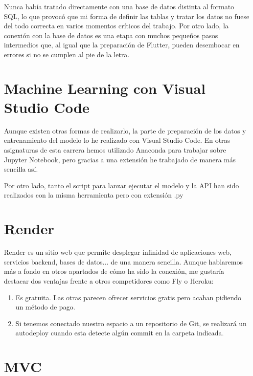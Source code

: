 	Nunca había tratado directamente con una base de datos distinta al formato SQL, lo que provocó que mi forma de definir las tablas y tratar los datos no fuese del todo correcta en varios momentos críticos del trabajo. Por otro lado, la conexión con la base de datos es una etapa con muchos pequeños pasos intermedios que, al igual que la preparación de Flutter, pueden desembocar en errores si no se cumplen al pie de la letra.


\section{Machine Learning con Visual Studio Code}

	Aunque existen otras formas de realizarlo, la parte de preparación de los datos y entrenamiento del modelo lo he realizado con Visual Studio Code. En otras asignaturas de esta carrera hemos utilizado Anaconda para trabajar sobre Jupyter Notebook, pero gracias a una extensión he trabajado de manera más sencilla así. 
	
	Por otro lado, tanto el script para lanzar ejecutar el modelo y la API han sido realizados con la misma herramienta pero con extensión .py	
	
\section{Render}

	Render es un sitio web que permite desplegar infinidad de aplicaciones web, servicios backend, bases de datos... de una manera sencilla. Aunque hablaremos más a fondo en otros apartados de cómo ha sido la conexión, me gustaría destacar dos ventajas frente a otros competidores como Fly o Heroku:
	\begin{enumerate}
		\item Es gratuita. Las otras parecen ofrecer servicios gratis pero acaban pidiendo un método de pago.
		\item Si tenemos conectado nuestro espacio a un repositorio de Git, se realizará un autodeploy cuando esta detecte algún commit en la carpeta indicada.
	\end{enumerate}
	
\section{MVC}

